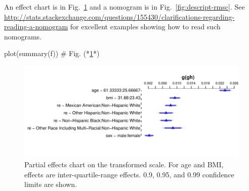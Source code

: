 An effect chart is in Fig.~\ref{fig:descript-rmsb} and a nomogram is
in Fig.~\ref{fig:descript-rmsc}.  See
\url{http://stats.stackexchange.com/questions/155430/clarifications-regarding-reading-a-nomogram}
for excellent examples showing how to read such nomograms.
\begin{Schunk}
\begin{Sinput}
plot(summary(f))   # Fig. (*\ref{fig:descript-rmsb}*)
\end{Sinput}
\begin{figure}[htbp]

\centerline{\includegraphics{descript-rmsb-1} }

\caption[Partial effects chart for transformed glycohemoglobin]{Partial effects chart on the transformed scale.  For age and BMI, effects are inter-quartile-range effects.  0.9, 0.95, and 0.99 confidence limits are shown.}\label{fig:descript-rmsb}
\end{figure}
\end{Schunk}
